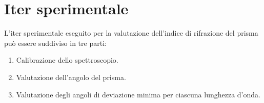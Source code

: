 \documentclass[a4paper,11pt]{article}
\begin{document}
	
	\section{Iter sperimentale}
	L'iter sperimentale eseguito per la valutazione dell'indice di rifrazione del prisma può essere suddiviso in tre parti:
	\begin{enumerate}
		\item Calibrazione dello spettroscopio.
		\item Valutazione dell'angolo del prisma.
		\item Valutazione degli angoli di deviazione minima per ciascuna lunghezza d'onda.
	\end{enumerate}
\end{document}
